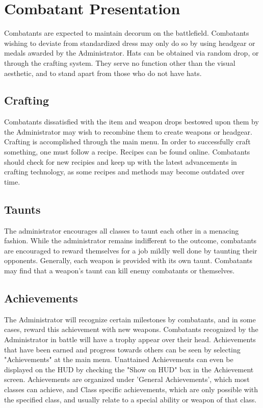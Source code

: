 \section{Combatant Presentation}
Combatants are expected to maintain decorum on the battlefield.  Combatants wishing to deviate from standardized dress may only do so by using headgear or medals awarded by the Administrator. Hats can be obtained via random drop, or through the crafting system. They serve no function other than the visual aesthetic, and to stand apart from those who do not have hats.

\subsection{Crafting}
Combatants dissatisfied with the item and weapon drops bestowed upon them by the Administrator may wish to recombine them to create weapons or headgear.  Crafting is accomplished through the main menu.  In order to successfully craft something, one must follow a recipe.  Recipes can be found online. Combatants should check for new recipies and keep up with the latest advancements in crafting technology, as some recipes and methods may become outdated over time. 

\subsection{Taunts}
The administrator encourages all classes to taunt each other in a menacing fashion. While the administrator remains indifferent to the outcome, combatants are encouraged to reward themselves for a job mildly well done by taunting their opponents. Generally, each weapon is provided with its own taunt. Combatants may find that a weapon's taunt can kill enemy combatants or themselves.
 
\subsection{Achievements}
The Administrator will recognize certain milestones by combatants, and in some cases, reward this achievement with new weapons. Combatants recognized by the Administrator in battle will have a trophy appear over their head. Achievements that have been earned and progress towards others can be seen by selecting "Achievements" at the main menu. Unattained Achievements can even be displayed on the HUD by checking the "Show on HUD" box in the Achievement screen.  Achievements are organized under 'General Achievements', which most classes can achieve, and Class specific achievements, which are only possible with the specified class, and usually relate to a special ability or weapon of that class.
